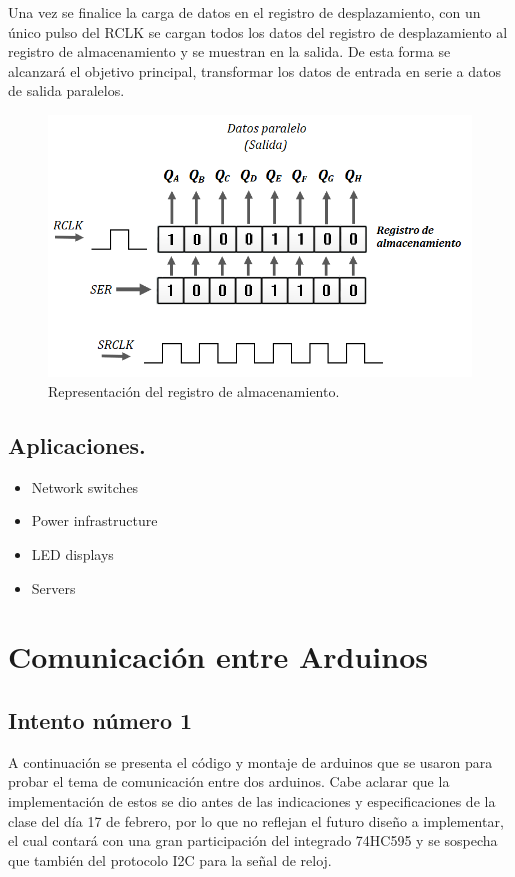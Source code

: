 \documentclass{article}
\begin{document}
Una vez se finalice la carga de datos en el registro de desplazamiento, con un único pulso del RCLK se cargan todos los datos del registro de desplazamiento al registro de almacenamiento y se muestran en la salida. De esta forma se alcanzará el objetivo principal, transformar los datos de entrada en serie a datos de salida paralelos.

\begin{figure}[h]
\includegraphics[scale=0.8]{salida.png}
\centering
\caption{Representación del registro de almacenamiento.}
\label{fig:salida}
\end{figure}










\newpage
\subsection{Aplicaciones.}\label{Aplicaciones}
\begin{itemize}
\item Network switches
\item Power infrastructure
\item LED displays
\item Servers
\end{itemize}


\section{Comunicación entre Arduinos} \label{Comunicación entre Arduinos}
\subsection{Intento número 1}\label{intento1}
A continuación se presenta el código y montaje de arduinos que se usaron para probar el tema de comunicación entre dos arduinos. Cabe aclarar que la implementación de estos se dio antes de las indicaciones y especificaciones de la clase del día 17 de febrero, por lo que no reflejan el futuro diseño a implementar, el cual contará con una gran participación del integrado 74HC595 y se sospecha que también del protocolo I2C para la señal de reloj.
\end{document}
